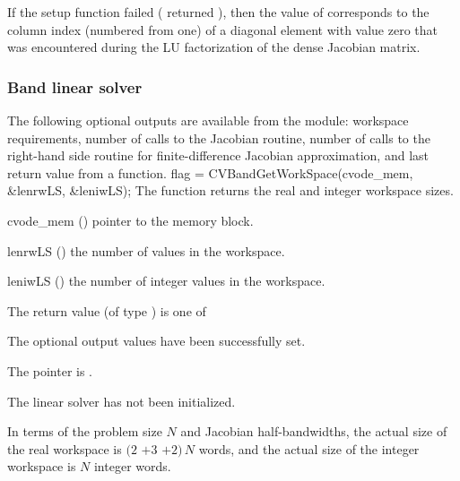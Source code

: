 {
  If the {\cvdense} setup function failed ( returned ),
  then the value of  corresponds to the column index (numbered from one)
  of a diagonal element with value zero that was encountered during the LU
  factorization of the dense Jacobian matrix.
}


\subsubsection{Band linear solver}\label{sss:optout_band}
The following optional outputs are available from the {\cvband} module:
workspace requirements, number of calls to the Jacobian routine, number of 
calls to the right-hand side routine for finite-difference Jacobian approximation,
and last return value from a {\cvband} function.
{
  flag = CVBandGetWorkSpace(cvode\_mem, \&lenrwLS, \&leniwLS);
}
{
  The function  returns the
  {\cvband} real and integer workspace sizes.
}
{
  \begin{args}
  \item[cvode\_mem] ()
    pointer to the {\cvodes} memory block.
  \item[lenrwLS] ()
    the number of  values in the {\cvband} workspace.
  \item[leniwLS] ()
    the number of integer values in the {\cvband} workspace.
  \end{args}
}
{
  The return value  (of type ) is one of
  \begin{args}
  \item[\Id{CVBAND\_SUCCESS}] 
    The optional output values have been successfully set.
  \item[\Id{CVBAND\_MEM\_NULL}]
    The  pointer is .
  \item[\Id{CVBAND\_LMEM\_NULL}]
    The {\cvband} linear solver has not been initialized.
  \end{args}
}
{
  In terms of the problem size $N$ and Jacobian half-bandwidths, 
  the actual size of the real workspace is
  $(2$ $+ 3$ $+ 2)\, N$  words,
  and the actual size of the integer workspace is $N$ integer words.
}
